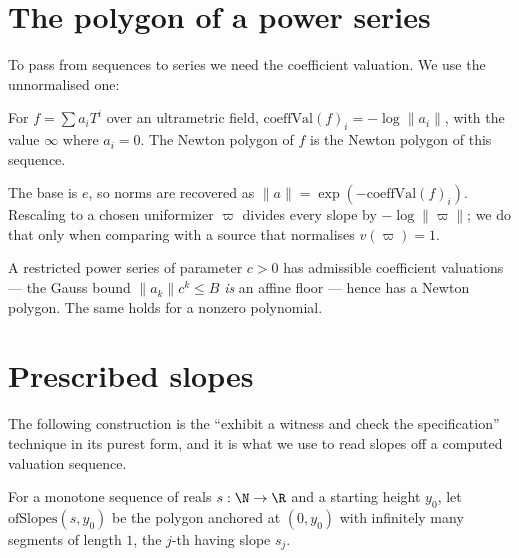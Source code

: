 \section{The polygon of a power series}

To pass from sequences to series we need the coefficient valuation.  We use the unnormalised one:

\begin{definition}
  \label{def:coeffval}
  \leanok
  For $f = \sum a_i T^i$ over an ultrametric field, $\mathrm{coeffVal}(f)_i = -\log \lVert a_i
  \rVert$, with the value $\infty$ where $a_i = 0$.  The Newton polygon of $f$ is the Newton
  polygon of this sequence.
\end{definition}

The base is $e$, so norms are recovered as $\lVert a \rVert = \exp(-\mathrm{coeffVal}(f)_i)$.
Rescaling to a chosen uniformizer $\varpi$ divides every slope by $-\log\lVert \varpi \rVert$;
we do that only when comparing with a source that normalises $v(\varpi) = 1$.

\begin{lemma}
  \label{lem:np-restricted}
  \leanok
  A restricted power series of parameter $c > 0$ has admissible coefficient valuations --- the
  Gauss bound $\lVert a_k \rVert c^k \leq B$ \emph{is} an affine floor --- hence has a Newton
  polygon.  The same holds for a nonzero polynomial.
\end{lemma}

\section{Prescribed slopes}

The following construction is the ``exhibit a witness and check the specification'' technique in
its purest form, and it is what we use to read slopes off a computed valuation sequence.

\begin{definition}
  \label{def:ofslopes}
  \leanok
  For a monotone sequence of reals $s : \N \to \R$ and a starting height $y_0$, let
  $\mathrm{ofSlopes}(s, y_0)$ be the polygon anchored at $(0, y_0)$ with infinitely many segments
  of length $1$, the $j$-th having slope $s_j$.
\end{definition}

